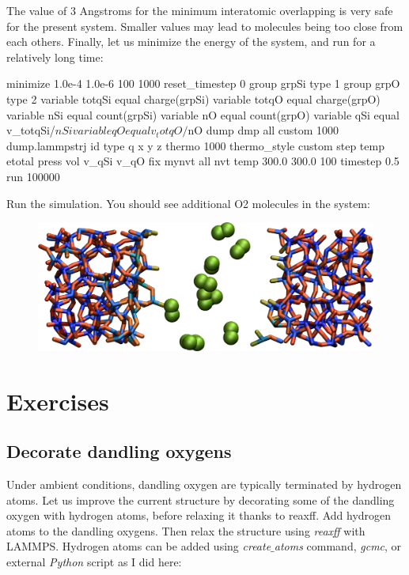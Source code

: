 \noindent The value of 3 Angstroms for the minimum interatomic overlapping is 
very safe for the present system. Smaller values may lead to molecules being 
too close from each others.
Finally, let us minimize the energy of the system, and run for a relatively long time:

\begin{lcverbatim}
minimize 1.0e-4 1.0e-6 100 1000
reset_timestep 0
group grpSi type 1
group grpO type 2
variable totqSi equal charge(grpSi)
variable totqO equal charge(grpO)
variable nSi equal count(grpSi)
variable nO equal count(grpO)
variable qSi equal v_totqSi/${nSi}
variable qO equal v_totqO/${nO}
dump dmp all custom 1000 dump.lammpstrj id type q x y z
thermo 1000
thermo_style custom step temp etotal press vol v_qSi v_qO
fix mynvt all nvt temp 300.0 300.0 100
timestep 0.5 
run 100000
\end{lcverbatim}

\noindent Run the simulation. You should see additional O2 molecules in the system:

\begin{figure}
\includegraphics[width=\linewidth]{tutorials/level3/reactive-silicon-dioxide/O2_light.png}
\end{figure}

\section{Exercises}

\noindent \subsection{Decorate dandling oxygens}

Under ambient conditions, dandling oxygen are typically terminated by hydrogen atoms. 
Let us improve the current structure by decorating some of the dandling oxygen with
hydrogen atoms, before relaxing it thanks to reaxff. 
Add hydrogen atoms to the dandling oxygens. Then relax the structure using \textit{reaxff} with LAMMPS.
Hydrogen atoms can be added using \textit{create$\_$atoms} command, \textit{gcmc}, or external \textit{Python} script as I did here:

